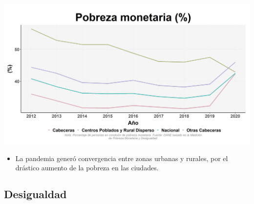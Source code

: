 \documentclass[aspectratio=169]{beamer}
\begin{document}
    \begin{slide}{4} 
            \begin{imagecolumn}
                \includegraphics[width=\columnwidth]{img/var_264_trend.png}
            \end{imagecolumn}
            \begin{textcolumn}
                \begin{itemize}
                    \item La pandemia generó convergencia entre zonas urbanas y rurales, por el drástico aumento de la pobreza en las ciudades.
                \end{itemize}
            \end{textcolumn}

    \printcolumns
    \end{slide}
    
    
    \subsection{Desigualdad}
 
\end{document}
